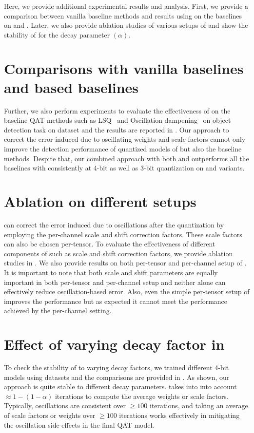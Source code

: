 Here, we provide additional experimental results and analysis. First, we provide a comparison between vanilla baseline methods and results using \qc{} on the baselines on \yoloa{} and \yolob{}. Later, we also provide ablation studies of various setups of \qc{} and show the stability of \exma{} for the decay parameter $(\alpha)$. 

\section{Comparisons with vanilla baselines and \qc{} based baselines}

Further, we also perform experiments to evaluate the effectiveness of \qc{} on the baseline \acrshort{QAT} methods such as \acrshort{LSQ}~\cite{lsq} and Oscillation dampening~\cite{nagel2022overcoming} on object detection task on \coco{} dataset and the results are reported in . Our \qc{} approach to correct the error induced due to oscillating weights and scale factors cannot only improve the detection performance of quantized models of \exma{} but also the baseline methods. Despite that, our combined approach with both \exma{} and \qc{} outperforms all the baselines with \qc{} consistently at 4-bit as well as 3-bit quantization on \yoloa{} and \yolob{} variants.

\section{Ablation on different \qc{} setups}

\qc{} can correct the error induced due to oscillations after the quantization by employing the per-channel scale and shift correction factors. These scale factors can also be chosen per-tensor. To evaluate the effectiveness of different components of \qc{} such as scale and shift correction factors, we provide ablation studies in . We also provide results on both per-tensor and per-channel setup of \qc{}. It is important to note that both scale and shift parameters are equally important in both per-tensor and per-channel \qc{} setup and neither alone can effectively reduce oscillation-based error. Also, even the simple per-tensor setup of \qc{} improves the \exma{} performance but as expected it cannot meet the performance achieved by the per-channel \qc{} setting.

\section{Effect of varying decay factor in \exma{}}

To check the stability of \exma{} to varying decay factors, we trained different 4-bit  models using \coco{} datasets and the comparisons are provided in . As shown, our \exma{} approach is quite stable to different decay parameters. \exma{} takes into into account $\approx1-(1-\alpha)$ iterations to compute the average weights or scale factors. Typically, oscillations are consistent over $\ge100$ iterations, and taking an average of scale factors or weights over $\ge 100$ iterations works effectively in mitigating the oscillation side-effects in the final \acrshort{QAT} model. 

